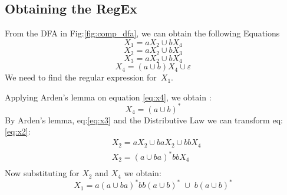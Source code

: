 \subsection*{Obtaining the RegEx}
From the DFA in Fig:\ref{fig:comp_dfa}, we can obtain the following Equations
\begin{equation}
\label{eq:x1}
        X_1 = aX_2 \cup bX_4
        \end{equation}
\begin{equation}
\label{eq:x2}
        X_2 = aX_2 \cup bX_3
        \end{equation}
\begin{equation}
\label{eq:x3}
        X_3 = aX_2 \cup bX_4
        \end{equation}
\begin{equation}
\label{eq:x4}
        X_4 = (a\cup b)X_4 \cup \varepsilon
        \end{equation}
We need to find the regular expression for~$X_1$.

Applying Arden's lemma on equation \ref{eq:x4}, we obtain : 
\begin{equation}
    \label{eq:x4-2}
    X_4 = {(a \cup b)} ^*
\end{equation}
By Arden's lemma, eq:\ref{eq:x3} and the Distributive Law we can transform eq:\ref{eq:x2}:
\begin{equation}
    \label{eq:x2-2}
    \begin{split}
        &X_2 = aX_2 \cup baX_2 \cup bbX_4 \\
        &X_2 = {(a \cup ba)}^* bbX_4\\
    \end{split}
\end{equation}
Now substituting for $X_2$ and $X_4$ we obtain:
\begin{equation}
    X_1 = a{(a \cup ba)}^* bb{(a\cup b)}^* \; \cup \; b(a \cup b )^*
\end{equation}
